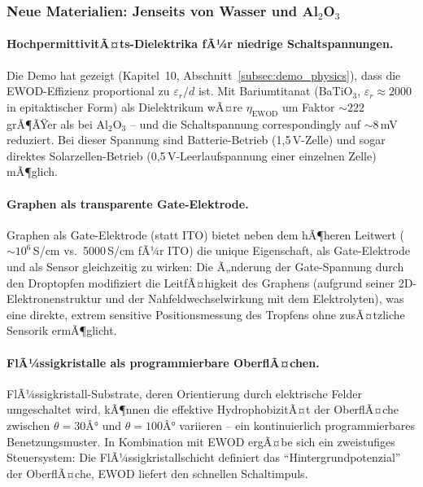 ﻿\documentclass[a4paper,12pt]{scrreprt}
\theoremstyle{definition}
\begin{document}
\subsubsection{Neue Materialien: Jenseits von Wasser und Al\texorpdfstring{$_2$}{2}O\texorpdfstring{$_3$}{3}}
\label{subsubsec:materialien}

\paragraph{HochpermittivitÃ¤ts-Dielektrika fÃ¼r niedrige Schaltspannungen.}
Die Demo hat gezeigt (Kapitel~10, Abschnitt~\ref{subsec:demo_physics}),
dass die EWOD-Effizienz proportional zu $\varepsilon_r/d$ ist.
Mit Bariumtitanat (BaTiO$_3$, $\varepsilon_r \approx 2000$ in
epitaktischer Form) als Dielektrikum wÃ¤re $\eta_\text{EWOD}$ um
Faktor $\sim 222$ grÃ¶ÃŸer als bei Al$_2$O$_3$ -- und die Schaltspannung
correspondingly auf $\sim$8\,mV reduziert. Bei dieser Spannung sind
Batterie-Betrieb (1,5\,V-Zelle) und sogar direktes Solarzellen-Betrieb
(0,5\,V-Leerlaufspannung einer einzelnen Zelle) mÃ¶glich.

\paragraph{Graphen als transparente Gate-Elektrode.}
Graphen als Gate-Elektrode (statt ITO) bietet neben dem hÃ¶heren
Leitwert ($\sim 10^6$\,S/cm vs.\ 5000\,S/cm fÃ¼r ITO) die unique
Eigenschaft, als Gate-Elektrode und als Sensor gleichzeitig zu
wirken: Die Ã„nderung der Gate-Spannung durch den Droptopfen
modifiziert die LeitfÃ¤higkeit des Graphens (aufgrund seiner
2D-Elektronenstruktur und der Nahfeldwechselwirkung mit dem
Elektrolyten), was eine direkte, extrem sensitive Positionsmessung
des Tropfens ohne zusÃ¤tzliche Sensorik ermÃ¶glicht.

\paragraph{FlÃ¼ssigkristalle als programmierbare OberflÃ¤chen.}
FlÃ¼ssigkristall-Substrate, deren Orientierung durch elektrische
Felder umgeschaltet wird, kÃ¶nnen die effektive HydrophobizitÃ¤t der
OberflÃ¤che zwischen $\theta = 30Â°$ und $\theta = 100Â°$ variieren --
ein kontinuierlich programmierbares Benetzungsmuster. In Kombination
mit EWOD ergÃ¤be sich ein zweistufiges Steuersystem: Die
FlÃ¼ssigkristallschicht definiert das ``Hintergrundpotenzial''
der OberflÃ¤che, EWOD liefert den schnellen Schaltimpuls.
\end{document}
